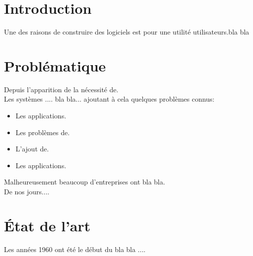 \documentclass[12pt, a4paper, openany]{report}
\begin{document}
\tableofcontents
\listoffigures
\listoftables



\chapter*{Introduction}
 
  Une des raisons de construire des logiciels est pour une utilité utilisateurs.bla bla
                                                      



\chapter*{Problématique}
   Depuis l’apparition de la nécessité de. \\
   
   Les systèmes .... bla bla... ajoutant à cela quelques problèmes connus:
   
    \begin{itemize}[label=$\square$]
      \item  Les applications.
      \item  Les problèmes de. 
      \item  L'ajout de.
      \item  Les applications.
  \end{itemize}
  
   Malheureusement beaucoup d'entreprises ont bla bla. \\
   
   De nos jours....
   
   



\chapter*{État de l'art}

 Les années 1960 ont été le début du bla bla .... \\
 
\end{document}
